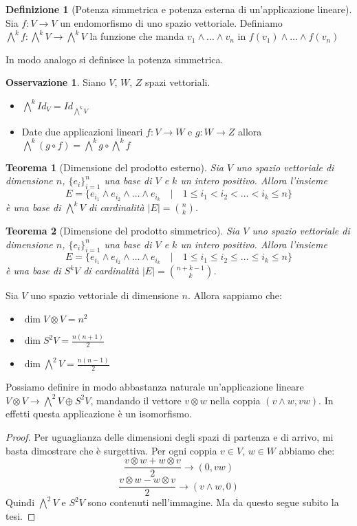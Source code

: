 \documentclass[11pt]{article}
\theoremstyle{plain}
\newtheorem{thm}{Teorema}[section]
\theoremstyle{definition}
\newtheorem{defn}{Definizione}[section]
\newtheorem*{rem}{Osservazione}
\theoremstyle{remark}
\begin{document}
\begin{defn}[Potenza simmetrica e potenza esterna di un'applicazione lineare]
Sia $f: V\to V$ un endomorfismo di uno spazio vettoriale. Definiamo 
$\bigwedge^k f : \bigwedge^k V \to \bigwedge^k V$ la funzione che manda $v_1 \wedge \ldots \wedge v_n$ in $f(v_1) \wedge \ldots \wedge f(v_n)$

In modo analogo si definisce la potenza simmetrica.
\end{defn}


\begin{rem} Siano $V$, $W$, $Z$ spazi vettoriali.
\begin{itemize}
   \item $\bigwedge^k Id_V = Id_{\bigwedge^kV}$
   \item Date due applicazioni lineari $f:V\to W$ e $g:W\to Z$ allora $\bigwedge^k(g\circ f) = \bigwedge^kg\circ\bigwedge^kf$
\end{itemize}
\end{rem}

\begin{thm}[Dimensione del prodotto esterno]
Sia $V$ uno spazio vettoriale di dimensione $n$, $\{e_i\}_{i=1}^n$ una base di $V$ e $k$ un intero positivo.
Allora l'insieme
\[E=\{e_{i_1} \wedge e_{i_2}\wedge \ldots \wedge e_{i_k} \quad|\quad 1 \leq i_1 < i_2 <\ldots< i_k \leq n\}\]
è una base di $\bigwedge^k V$ di cardinalità $|E|= \binom {n}{k}$.
\label{thm:prodotto esterno}
\end{thm}


\begin{thm}[Dimensione del prodotto simmetrico]
Sia $V$ uno spazio vettoriale di dimensione $n$, $\{e_i\}_{i=1}^n$ una base di $V$ e $k$ un intero positivo.
Allora l'insieme 
\[E=\{e_{i_1} \wedge e_{i_2}\wedge\ldots \wedge e_{i_k} \quad|\quad 1 \leq i_1 \leq i_2 \leq\ldots\leq i_k \leq n\}\]
è una base di $S^k V$ di cardinalità $|E|= \binom {n+k-1}{k}$.
\label{thm:prodotto simmetrico}
\end{thm}

Sia $V$ uno spazio vettoriale di dimensione $n$. Allora sappiamo che:
\begin{itemize}
\item $\dim V\otimes V = n^2$
\item $\dim S^2V = \frac{n(n+1)}{2}$
\item $\dim \bigwedge^2V = \frac{n(n-1)}{2}$
\end{itemize}
Possiamo definire in modo abbastanza naturale un'applicazione lineare $V\otimes V\to \bigwedge^2V\oplus S^2V$,
mandando il vettore $v\otimes w$ nella coppia $(v\wedge w, vw)$. In effetti questa applicazione è un isomorfismo.
\begin{proof}
Per uguaglianza delle dimensioni degli spazi di partenza e di arrivo, mi basta dimostrare che è surgettiva.
Per ogni coppia $v\in V$, $w\in W$ abbiamo che:
\[\frac{v\otimes w + w\otimes v}{2} \to (0, vw)\]
\[\frac{v\otimes w - w\otimes v}{2} \to (v\wedge w, 0)\]
Quindi $\bigwedge^2V$ e $S^2V$ sono contenuti nell'immagine. Ma da questo segue subito la tesi.
\end{proof}
\end{document}
